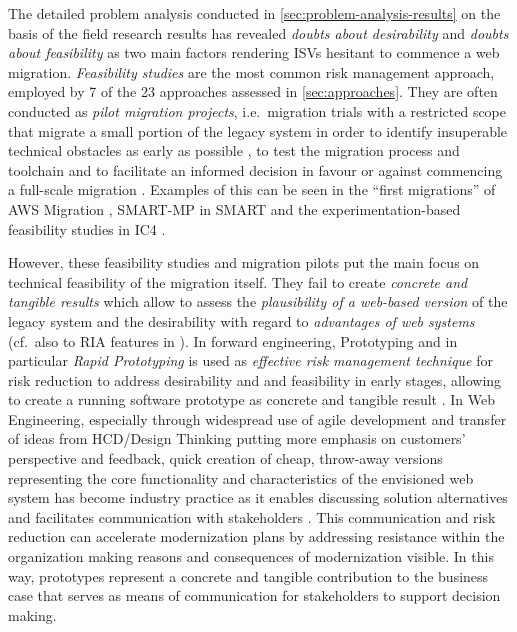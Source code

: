 The detailed problem analysis conducted in \cref{sec:problem-analysis-results} on the basis of the field research results has revealed \emph{doubts about desirability} and \emph{doubts about feasibility} as two main factors rendering ISVs hesitant to commence a web migration.
\emph{Feasibility studies} are the most common risk management approach, employed by 7 of the 23 approaches assessed in \cref{sec:approaches}.
They are often conducted as \emph{pilot migration projects}, i.e.~migration trials with a restricted scope that migrate a small portion of the legacy system in order to identify insuperable technical obstacles as early as possible \autocite{Sneed2010SoftwareMigration}, to test the migration process and toolchain \autocite{AmazonWebServices2018Migration} and to facilitate an informed decision in favour or against commencing a full-scale migration \autocite{Sneed2010SoftwareMigration}.
Examples of this can be seen in the ``first migrations'' of AWS Migration \autocite{AmazonWebServices2018Migration}, SMART-MP \autocite{CMUSoftwareEngineeringInstitute2013a} in SMART \autocite{Lewis2005SMART,Lewis2008SMART} and the experimentation-based feasibility studies in IC4 \autocite{Fowley2018Experimentation}.

However, these feasibility studies and migration pilots put the main focus on technical feasibility of the migration itself.
They fail to create \emph{concrete and tangible results} which allow to assess the \emph{plausibility of a web-based version} of the legacy system and the desirability with regard to \emph{advantages of web systems} (cf.~also to RIA features in \autocite{Rodriguez-Echeverria2012MIGRARIA}).
In forward engineering, Prototyping \autocite{Wallmueller2001SoftwareQuality} and in particular \emph{Rapid Prototyping} \autocite{ISO/IEEE24765Vocabulary,Gordon1995RapidPrototyping} is used as \emph{effective risk management technique} \autocite{Wallmueller2001SoftwareQuality} for risk reduction \autocite{ISO/IEEE24765Vocabulary} to address desirability and and feasibility in early stages, allowing to create a running software prototype as concrete and tangible result \autocite{Alavi1984}.
In Web Engineering, especially through widespread use of agile development \autocite{Abrahamsson2002Agile} and transfer of ideas from HCD/Design Thinking \autocite{HCD2015} putting more emphasis on customers' perspective and feedback, quick creation of cheap, throw-away versions representing the core functionality and characteristics of the envisioned web system has become industry practice as it enables discussing solution alternatives and facilitates communication with stakeholders \autocite{Alavi1984,HCD2015}.
This communication and risk reduction can accelerate modernization plans \autocite{ForresterResearch2011Modernization} by addressing resistance within the organization \autocite{Khadka2014ProfessionalsModernization,Sneed2010ReMiP} making reasons and consequences of modernization visible.
In this way, prototypes represent a concrete and tangible contribution to the business case that serves as means of communication for stakeholders to support decision making.

